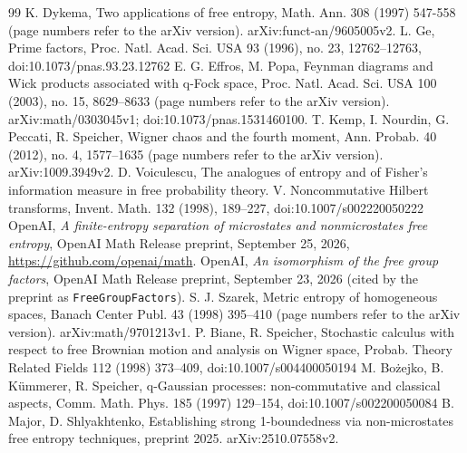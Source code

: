 \documentclass[11pt]{article}
\begin{document}
\begin{thebibliography}{99}
 K. Dykema, Two applications of free entropy, Math. Ann. 308 (1997) 547-558 (page numbers refer to the arXiv version). arXiv:funct-an/9605005v2.
 L. Ge, Prime factors, Proc. Natl. Acad. Sci. USA 93 (1996), no. 23, 12762--12763, doi:10.1073/pnas.93.23.12762
 E. G. Effros, M. Popa, Feynman diagrams and Wick products associated with q-Fock space, Proc. Natl. Acad. Sci. USA 100 (2003), no. 15, 8629--8633 (page numbers refer to the arXiv version). arXiv:math/0303045v1; doi:10.1073/pnas.1531460100.
 T. Kemp, I. Nourdin, G. Peccati, R. Speicher, Wigner chaos and the fourth moment, Ann. Probab. 40 (2012), no. 4, 1577--1635 (page numbers refer to the arXiv version). arXiv:1009.3949v2.
 D. Voiculescu, The analogues of entropy and of Fisher's information measure in free probability theory. V. Noncommutative Hilbert transforms, Invent. Math. 132 (1998), 189--227, doi:10.1007/s002220050222
 OpenAI, \emph{A finite-entropy separation of microstates and nonmicrostates free entropy}, OpenAI Math Release preprint, September 25, 2026, \url{https://github.com/openai/math}.
 OpenAI, \emph{An isomorphism of the free group factors}, OpenAI Math Release preprint, September 23, 2026 (cited by the preprint as \texttt{FreeGroupFactors}).
 S. J. Szarek, Metric entropy of homogeneous spaces, Banach Center Publ. 43 (1998) 395--410 (page numbers refer to the arXiv version). arXiv:math/9701213v1.
 P. Biane, R. Speicher, Stochastic calculus with respect to free Brownian motion and analysis on Wigner space, Probab. Theory Related Fields 112 (1998) 373--409, doi:10.1007/s004400050194
 M. Bo\.zejko, B. K\"ummerer, R. Speicher, q-Gaussian processes: non-commutative and classical aspects, Comm. Math. Phys. 185 (1997) 129--154, doi:10.1007/s002200050084
 B. Major, D. Shlyakhtenko, Establishing strong 1-boundedness via non-microstates free entropy techniques, preprint 2025. arXiv:2510.07558v2.
\end{thebibliography}
\space%
\end{document}
